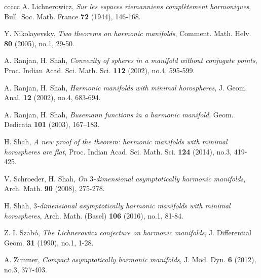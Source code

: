 \documentclass[12pt,a4paper]{amsart}
\theoremstyle{definition}
\theoremstyle{remark}
\newcommand \<{\langle}
\renewcommand \>{\rangle}
\begin{document}
\begin{thebibliography}{ccccc}
A. Lichnerowicz, \textit{Sur les espaces riemanniens complètement harmoniques}, Bull. Soc. Math. France {\bf 72} (1944), 146-168.




Y. Nikolayevsky, \textit{Two theorems on harmonic manifolds}, Comment. Math. Helv. {\bf 80} (2005), no.1, 29-50.




A. Ranjan, H. Shah, \textit{Convexity of spheres in a manifold without conjugate points}, Proc. Indian Acad. Sci. Math. Sci. {\bf 112} (2002), no.4, 595-599.

A. Ranjan, H. Shah, \textit{Harmonic manifolds with minimal horospheres}, J. Geom. Anal. {\bf 12} (2002), no.4, 683-694.


A. Ranjan, H. Shah, \textit{Busemann functions in a harmonic manifold}, Geom. Dedicata {\bf 101} (2003), 167–183.

H. Shah, \textit{A new proof of the theorem: harmonic manifolds with minimal horospheres are flat}, Proc. Indian Acad. Sci. Math. Sci. {\bf 124} (2014), no.3, 419-425.

V. Schroeder, H. Shah,
\textit{On $3$-dimensional asymptotically harmonic manifolds},
Arch. Math. {\bf 90} (2008), 275-278.

H. Shah, \textit{$3$-dimensional asymptotically harmonic manifolds with minimal horospheres}, Arch. Math. (Basel) {\bf 106} (2016), no.1, 81-84.

Z. I. Szab\'o, \textit{The Lichnerowicz conjecture on harmonic manifolds}, J. Differential Geom. {\bf 31} (1990), no.1, 1-28.

A. Zimmer, \textit{Compact asymptotically harmonic manifolds}, J. Mod. Dyn. {\bf 6} (2012), no.3, 377-403.


\end{thebibliography}
\end{document}
